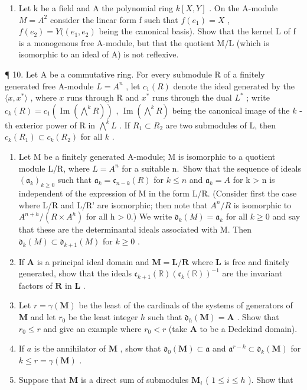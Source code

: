 \begin{enumerate}
\def\labelenumi{\arabic{enumi}.}
\setcounter{enumi}{8}
\tightlist
\item
  Let k be a field and A the polynomial ring \(k[X,Y]\) . On the A-module \(M = A^{2}\) consider the linear form f such that \(f(e_{1}) = X\) , \(f(e_{2}) = Y((e_{1}, e_{2})\) being the canonical basis). Show that the kernel L of f is a monogenous free A-module, but that the quotient M/L (which is isomorphic to an ideal of A) is not reflexive.
\end{enumerate}

¶ 10. Let A be a commutative ring. For every submodule R of a finitely generated free A-module \(L = A^n\) , let \(c_1(R)\) denote the ideal generated by the \(\langle x, x^* \rangle\) , where \(x\) runs through R and \(x^*\) runs through the dual \(L^*\) ; write \(c_k(R) = c_1\left(\operatorname{Im}\left(\bigwedge^k R\right)\right)\) , \(\operatorname{Im}\left(\bigwedge^k R\right)\) being the canonical image of the \(k\) -th exterior power of R in \(\bigwedge^k L\) . If \(R_1 \subset R_2\) are two submodules of L, then \(c_k(R_1) \subset c_k(R_2)\) for all \(k\) .

\begin{enumerate}
\def\labelenumi{(\alph{enumi})}
\item
  Let M be a finitely generated A-module; M is isomorphic to a quotient module L/R, where \(L = A^{n}\) for a suitable n.~Show that the sequence of ideals \((\mathfrak{a}_{k})_{k \geqslant 0}\) such that \(\mathfrak{a}_{k} = \mathfrak{c}_{n-k}(R)\) for \(k \leqslant n\) and \(\mathfrak{a}_{k} = A\) for k \textgreater{} n is independent of the expression of M in the form L/R. (Consider first the case where L/R and L/R' are isomorphic; then note that \(A^{n}/R\) is isomorphic to \(A^{n+h}/(R \times A^{h})\) for all h \textgreater{} 0.) We write \(\mathfrak{d}_{k}(M) = \mathfrak{a}_{k}\) for all \(k \geqslant 0\) and say that these are the determinantal ideals associated with M. Then \(\mathfrak{d}_{k}(M) \subset \mathfrak{d}_{k+1}(M)\) for \(k \geqslant 0\) .
\item
  If \(\mathbf{A}\) is a principal ideal domain and \(\mathbf{M} = \mathbf{L} / \mathbf{R}\) where \(\mathbf{L}\) is free and finitely generated, show that the ideals \(\mathfrak{c}_{k + 1}(\mathbb{R})(\mathfrak{c}_k(\mathbb{R}))^{-1}\) are the invariant factors of \(\mathbf{R}\) in \(\mathbf{L}\) .
\item
  Let \(r = \gamma(\mathbf{M})\) be the least of the cardinals of the systems of generators of \(\mathbf{M}\) and let \(r_0\) be the least integer \(h\) such that \(\mathfrak{d}_h(\mathbf{M}) = \mathbf{A}\) . Show that \(r_0 \leqslant r\) and give an example where \(r_0 < r\) (take \(\mathbf{A}\) to be a Dedekind domain).
\item
  If \(a\) is the annihilator of \(\mathbf{M}\) , show that \(\mathfrak{d}_0(\mathbf{M}) \subset \mathfrak{a}\) and \(\mathfrak{a}^{r - k} \subset \mathfrak{d}_k(\mathbf{M})\) for \(k \leqslant r = \gamma (\mathbf{M})\) .
\item
  Suppose that \(\mathbf{M}\) is a direct sum of submodules \(\mathbf{M}_i\) ( \(1 \leqslant i \leqslant h\) ). Show that
\end{enumerate}

